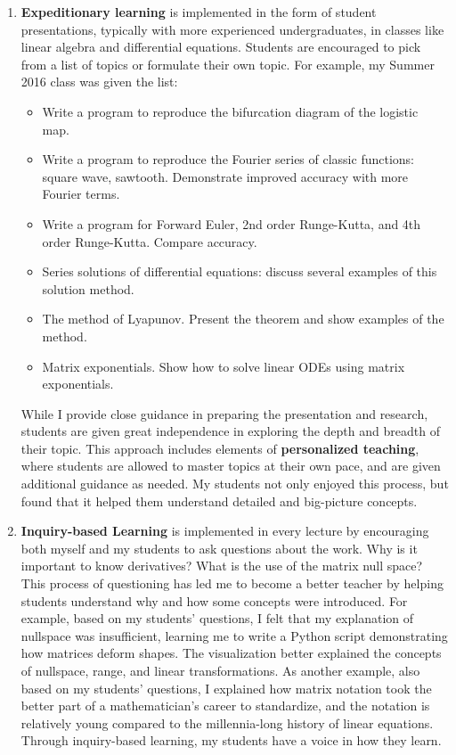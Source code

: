 \documentclass[a4paper,11pt]{article}
\begin{document}
\begin{enumerate}
	\item \textbf{Expeditionary learning} is implemented in the form of student presentations, typically with more experienced undergraduates, in classes like linear algebra and differential equations. Students are encouraged to pick from a list of topics or formulate their own topic. For example, my Summer 2016 class was given the list:
	\begin{itemize}
		\item Write a program to reproduce the bifurcation diagram of the logistic map.
		\item Write a program to reproduce the Fourier series of classic functions: square wave, sawtooth. Demonstrate improved accuracy with more Fourier terms.
		\item Write a program for Forward Euler, 2nd order Runge-Kutta, and 4th order Runge-Kutta. Compare accuracy.
		\item Series solutions of differential equations: discuss several examples of this solution method.
		\item The method of Lyapunov. Present the theorem and show examples of the method.
		\item Matrix exponentials. Show how to solve linear ODEs using matrix exponentials.
	\end{itemize}
	While I provide close guidance in preparing the presentation and research, students are given great independence in exploring the depth and breadth of their topic. This approach includes elements of \textbf{personalized teaching}, where students are allowed to master topics at their own pace, and are given additional guidance as needed. My students not only enjoyed this process, but found that it helped them understand detailed and big-picture concepts.
	
	\item \textbf{Inquiry-based Learning} is implemented in every lecture by encouraging both myself and my students to ask questions about the work. Why is it important to know derivatives? What is the use of the matrix null space? This process of questioning has led me to become a better teacher by helping students understand why and how some concepts were introduced. For example, based on my students' questions, I felt that my explanation of nullspace was insufficient, learning me to write a Python script demonstrating how matrices deform shapes. The visualization better explained the concepts of nullspace, range, and linear transformations. As another example, also based on my students' questions, I explained how matrix notation took the better part of a mathematician's career to standardize, and the notation is relatively young compared to the millennia-long history of linear equations. Through inquiry-based learning, my students have a voice in how they learn.
	

\end{enumerate}
\end{document}
